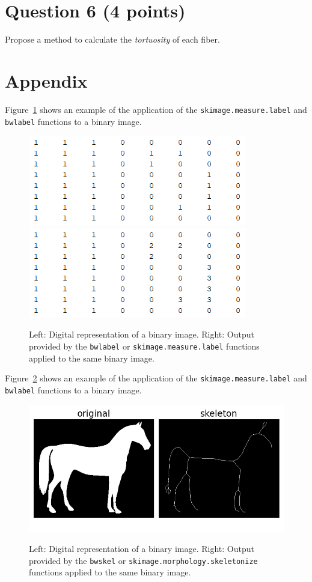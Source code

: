 \documentclass{article}
\begin{document}
\section*{Question 6 (4 points)}
Propose a method to calculate the \textit{tortuosity} of each fiber.






\section*{Appendix}
Figure~\ref{Fig:BWLABEL} shows an example of the application of the \texttt{skimage.measure.label} and \texttt{bwlabel} functions to a binary image.
\begin{figure}[!h]
\begin{center}
\includegraphics[width=.45\textwidth]{BW.png}
\qquad
\vline
\qquad
\includegraphics[width=.45\textwidth]{LABEL.png}
\label{Fig:BWLABEL}
\caption{Left: Digital representation of a binary image. Right: Output provided by the \texttt{bwlabel} or \texttt{skimage.measure.label} functions applied to the same binary image.}
\end{center}
\end{figure}

Figure~\ref{Fig:SKEL} shows an example of the application of the \texttt{skimage.measure.label} and \texttt{bwlabel} functions to a binary image.
\begin{figure}[!h]
\begin{center}
\includegraphics[width=.90\textwidth]{sphx_glr_plot_skeleton_001.png}
\label{Fig:SKEL}
\caption{Left: Digital representation of a binary image. Right: Output provided by the \texttt{bwskel} or \texttt{skimage.morphology.skeletonize} functions applied to the same binary image.}
\end{center}
\end{figure}
\end{document}
